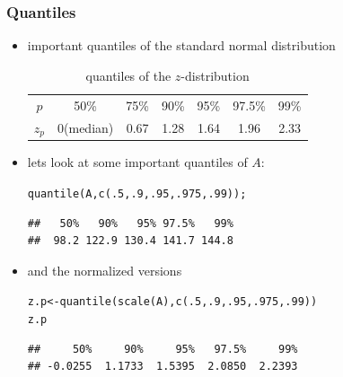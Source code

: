 \documentclass[extsize,handout,10pt]{beamer}\usepackage[]{graphicx}\usepackage[]{color}
\makeatletter
\newcommand{\hlnum}[1]{\textcolor[rgb]{0.502,0.086,1}{#1}}%
\newcommand{\hlstd}[1]{\textcolor[rgb]{0.251,0.251,0.251}{#1}}%
\newcommand{\hlkwb}[1]{\textcolor[rgb]{0,0.439,0.902}{#1}}%
\newcommand{\hlkwd}[1]{\textcolor[rgb]{0.69,0.188,0.941}{#1}}%
\newenvironment{kframe}{%
 \def\at@end@of@kframe{}%
 \ifinner\ifhmode%
  \def\at@end@of@kframe{\end{minipage}}%
  \begin{minipage}{\columnwidth}%
 \fi\fi%
 \def\FrameCommand##1{\hskip\@totalleftmargin \hskip-\fboxsep
 \colorbox{shadecolor}{##1}\hskip-\fboxsep
     \hskip-\linewidth \hskip-\@totalleftmargin \hskip\columnwidth}%
 \MakeFramed {\advance\hsize-\width
   \@totalleftmargin\z@ \linewidth\hsize
   \@setminipage}}%
 {\par\unskip\endMakeFramed%
 \at@end@of@kframe}
\newenvironment{knitrout}{}{} %
\makeatother
\begin{document}
  \begin{frame}[containsverbatim]
    \frametitle{Quantiles}
    \begin{itemize}
    \item<1-> important quantiles of the standard normal distribution
      \begin{table}[h]
        \centering
        \begin{tabular}{c|c|c|c|c|c|c}
          $p$	&	50\%	&	75\%	&	90\%	&	95\%	&	97.5\%	&	99\%\\
          $z_p$	&	0(median)	&	0.67	&	1.28	&	1.64	&	1.96	&	2.33\\
        \end{tabular}
        \caption{quantiles of the $z$-distribution}
        \label{tab:QuantilenDerZVerteilung}
      \end{table}
    \item lets look at some important quantiles of $A$: 
\scriptsize


\begin{knitrout}\tiny
{}\color{fgcolor}\begin{kframe}
\begin{alltt}
\hlkwd{quantile}\hlstd{(A,}\hlkwd{c}\hlstd{(}\hlnum{.5}\hlstd{,}\hlnum{.9}\hlstd{,}\hlnum{.95}\hlstd{,}\hlnum{.975}\hlstd{,}\hlnum{.99}\hlstd{));}
\end{alltt}
\begin{verbatim}
##   50%   90%   95% 97.5%   99% 
##  98.2 122.9 130.4 141.7 144.8
\end{verbatim}
\end{kframe}
\end{knitrout}
\item and the normalized versions
\begin{knitrout}\tiny
{}\color{fgcolor}\begin{kframe}
\begin{alltt}
\hlstd{z.p} \hlkwb{<-} \hlkwd{quantile}\hlstd{(}\hlkwd{scale}\hlstd{(A),}\hlkwd{c}\hlstd{(}\hlnum{.5}\hlstd{,}\hlnum{.9}\hlstd{,}\hlnum{.95}\hlstd{,}\hlnum{.975}\hlstd{,}\hlnum{.99}\hlstd{))}
\hlstd{z.p}
\end{alltt}
\begin{verbatim}
##     50%     90%     95%   97.5%     99% 
## -0.0255  1.1733  1.5395  2.0850  2.2393
\end{verbatim}
\end{kframe}
\end{knitrout}

\end{itemize}
  \end{frame}
  
\end{document}

